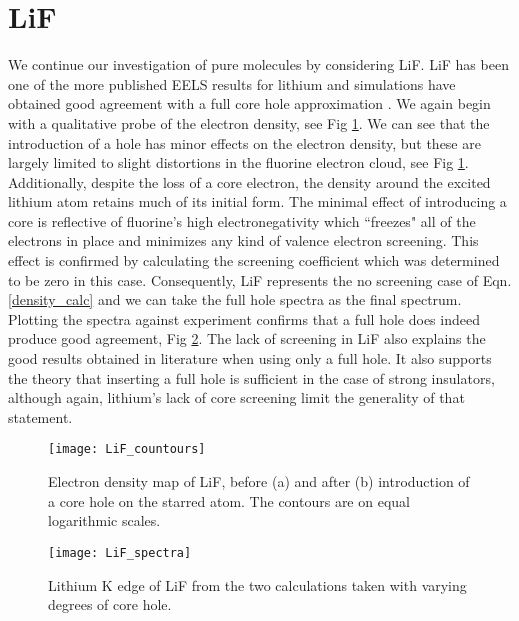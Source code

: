 \section{LiF}
We continue our investigation of pure molecules by considering LiF.  LiF has been one of the more published EELS results for lithium and simulations have obtained good agreement with a full core hole approximation \cite{mauchamp_ab_2006}.  We again begin with a qualitative probe of the electron density, see Fig \ref{LiF_countours}.  We can see that the introduction of a hole has minor effects on the electron density, but these are largely limited to slight distortions in the fluorine electron cloud, see Fig \ref{LiF_countours}. Additionally, despite the loss of a core electron, the density around the excited lithium atom retains much of its initial form. The minimal effect of introducing a core is reflective of fluorine's high electronegativity which ``freezes" all of the electrons in place and minimizes any kind of valence electron screening.  This effect is confirmed by calculating the screening coefficient which was determined to be zero in this case. Consequently, LiF represents the no screening case of Eqn. \ref{density_calc} and we can take the full hole spectra as the final spectrum.  Plotting the spectra against experiment confirms that a full hole does indeed produce good agreement, Fig \ref{LiF_spectra}.  The lack of screening in LiF also explains the good results obtained in literature when using only a full hole.  It also supports the theory that inserting a full hole is sufficient in the case of strong insulators, although again, lithium's lack of core screening limit the generality of that statement.  

\begin{figure}
	\centering
	\texttt{[image: LiF\_countours]}
	\caption{Electron density map of LiF, before (a) and after (b) introduction of a core hole on the starred atom.  The contours are on equal logarithmic scales.}
	\label{LiF_countours}
\end{figure}

\begin{figure}
	\centering
	\texttt{[image: LiF\_spectra]}
	\caption{Lithium K edge of LiF from the two calculations taken with varying degrees of core hole. }
	\label{LiF_spectra}
\end{figure}



